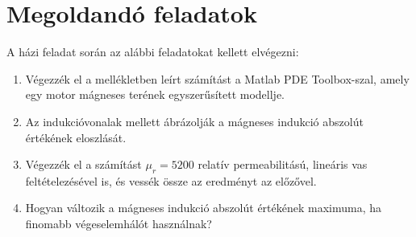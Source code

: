 \chapter{Megoldandó feladatok}\label{sect:LatexTools}
A házi feladat során az alábbi feladatokat kellett elvégezni:
\begin{enumerate}
	\item Végezzék el a mellékletben leírt számítást a Matlab PDE Toolbox-szal, amely egy motor mágneses terének egyszerűsített modellje.
	\item Az indukcióvonalak mellett ábrázolják a mágneses indukció abszolút értékének eloszlását.
	\item Végezzék el a számítást $ \mu_{r}=5200 $ relatív permeabilitású, lineáris vas feltételezésével is, és vessék össze az eredményt az előzővel. 
	\item Hogyan változik a mágneses indukció abszolút értékének maximuma, ha finomabb végeselemhálót használnak?
\end{enumerate}
